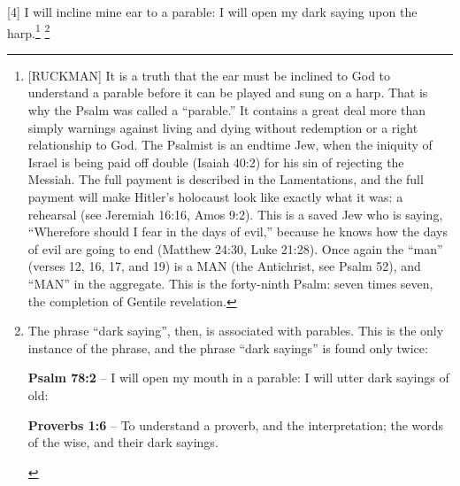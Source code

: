 [4] \textcolor[rgb]{0.00,0.00,1.00}{I will incline mine ear to a parable: I will open my dark saying upon the harp.}\footnote{[RUCKMAN] It is a truth that the ear must be inclined to God to understand a parable before it can be played and sung on a harp. That is why the Psalm was called a ``parable.'' It contains a great deal more than simply warnings against living and dying without redemption or a right relationship to God. The Psalmist is an endtime Jew, when the iniquity of Israel is being paid off double (Isaiah 40:2) for his sin of rejecting the Messiah. The full payment is described in the Lamentations, and the full payment will make Hitler’s holocaust look like exactly what it was: a rehearsal (see Jeremiah 16:16, Amos 9:2). This is a saved Jew who is saying, “Wherefore should I fear in the days of evil,” because he knows how the days of evil are going to end (Matthew 24:30, Luke 21:28). Once again the “man” (verses 12, 16, 17, and 19) is a MAN (the Antichrist, see Psalm 52), and “MAN” in the aggregate. This is the forty-ninth Psalm: seven times seven, the completion of Gentile revelation.\cite{Ruckman1992Psalms}} \footnote{The phrase ``dark saying'', then, is associated with parables. This is the only instance of the phrase, and the phrase ``dark sayings'' is found only twice: \begin{compactenum}
\item \textbf{Psalm 78:2} -- I will open my mouth in a parable: I will utter dark sayings of old: 
\item \textbf{Proverbs 1:6} -- To understand a proverb, and the interpretation; the words of the wise, and their dark sayings.
\end{compactenum} }
